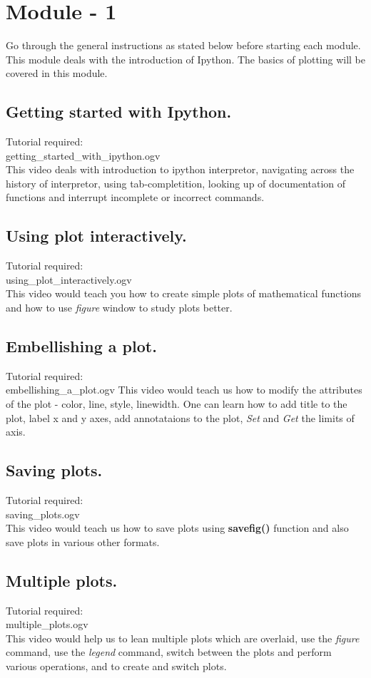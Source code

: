 \documentclass[11pt,twocolumn]{article}
\begin{document}
\section{Module - 1}
Go through the general instructions as stated below before starting each module. \\
  This module deals with the introduction of Ipython. The basics of plotting will be covered in this module.
  \subsection{Getting started with Ipython.}
    Tutorial required: \\getting\_started\_with\_ipython.ogv \\ 
    This video deals with introduction to ipython interpretor, navigating across the history of interpretor, using tab-completition, looking up of documentation of functions and interrupt incomplete or incorrect commands. 
    \subsection{Using plot interactively.}
   Tutorial required: \\using\_plot\_interactively.ogv \\
    This video would teach you how to create simple plots of mathematical functions and how to use \emph{figure} window to study plots better. 
    \subsection{Embellishing a plot.}
    Tutorial required:\\ embellishing\_a\_plot.ogv
      This video would teach us how to modify the attributes of the plot - color, line, style, linewidth. One can learn how to add title to the plot, label x and y axes, add annotataions to the plot, \emph{Set} and \emph{Get} the limits of axis.
    \subsection{Saving plots.}
    Tutorial required: \\ saving\_plots.ogv \\
    
      This video would teach us how to save plots using \textbf{savefig()} function and also save plots in various other formats.
    \subsection{Multiple plots.}
    Tutorial required: \\multiple\_plots.ogv \\
      This video would help us to lean multiple plots which are overlaid, use the \emph{figure} command, use the \emph{legend} command, switch between the plots and perform various operations, and to create and switch plots. 
\end{document}
